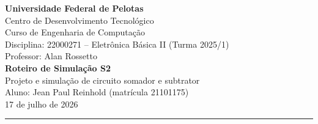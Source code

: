 \documentclass[11pt,a4paper]{article}
\begin{document}
\begin{center}
  {\large \textbf{Universidade Federal de Pelotas}}\\
  Centro de Desenvolvimento Tecnológico\\
  Curso de Engenharia de Computação\\
  Disciplina: 22000271 -- Eletrônica Básica II (Turma 2025/1)\\
  Professor: Alan Rossetto\\[3ex]
  {\LARGE\bfseries Roteiro de Simulação S2}\\[0.6ex]
  {\large Projeto e simulação de circuito somador e subtrator}\\[2ex]
  Aluno: Jean Paul Reinhold (matrícula 21101175)\\
  17 de julho de 2026
\end{center}

\vspace{1ex}
\hrule
\vspace{2ex}






\clearpage

\end{document}

